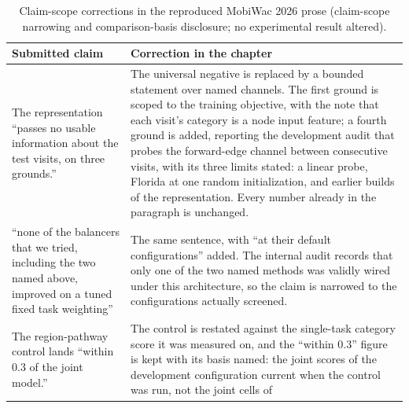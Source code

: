 \begin{table}[htb]
\caption{Claim-scope corrections in the reproduced MobiWac 2026 prose (claim-scope
narrowing and comparison-basis disclosure; no experimental result altered).}
\label{tab:apx:mobiwac-scope}
\centering
\small
\begin{tabular}{@{}p{}p{}@{}}
\toprule
\textbf{Submitted claim} & \textbf{Correction in the chapter} \\
\midrule
The representation ``passes no usable information about the test visits, on three
grounds.'' &
The universal negative is replaced by a bounded statement over named channels. The first
ground is scoped to the training objective, with the note that each visit's category is a
node input feature; a fourth ground is added, reporting the development audit that probes
the forward-edge channel between consecutive visits, with its three limits stated: a
linear probe, Florida at one random initialization, and earlier builds of the
representation. Every number already in the paragraph is unchanged. \\
\addlinespace
``none of the balancers that we tried, including the two named above, improved on a tuned
fixed task weighting'' &
The same sentence, with ``at their default configurations'' added. The internal audit
records that only one of the two named methods was validly wired under this architecture,
so the claim is narrowed to the configurations actually screened. \\
\addlinespace
The region-pathway control lands ``within $0.3$ of the joint model.'' &
The control is restated against the single-task category score it was measured on, and the
``within $0.3$'' figure is kept with its basis named: the joint scores of the development
configuration current when the control was run, not the joint cells of

\end{tabular}
\end{table}
